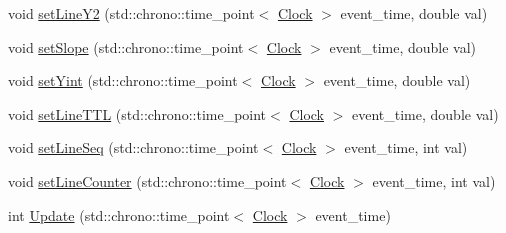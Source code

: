 \begin{DoxyCompactItemize}
\item 
void \mbox{\hyperlink{classLine_a671f64c437fe1bef798476d93c675099}{set\+Line\+Y2}} (std\+::chrono\+::time\+\_\+point$<$ \mbox{\hyperlink{universe_8h_a0ef8d951d1ca5ab3cfaf7ab4c7a6fd80}{Clock}} $>$ event\+\_\+time, double val)
\item 
void \mbox{\hyperlink{classLine_a3fb9e9eab13d146feff0bc891709eaf9}{set\+Slope}} (std\+::chrono\+::time\+\_\+point$<$ \mbox{\hyperlink{universe_8h_a0ef8d951d1ca5ab3cfaf7ab4c7a6fd80}{Clock}} $>$ event\+\_\+time, double val)
\item 
void \mbox{\hyperlink{classLine_ad966eb3f1bd4cb29976b3e97811c344f}{set\+Yint}} (std\+::chrono\+::time\+\_\+point$<$ \mbox{\hyperlink{universe_8h_a0ef8d951d1ca5ab3cfaf7ab4c7a6fd80}{Clock}} $>$ event\+\_\+time, double val)
\item 
void \mbox{\hyperlink{classLine_a602398c8c3131ec7236ccadbab8281d5}{set\+Line\+T\+TL}} (std\+::chrono\+::time\+\_\+point$<$ \mbox{\hyperlink{universe_8h_a0ef8d951d1ca5ab3cfaf7ab4c7a6fd80}{Clock}} $>$ event\+\_\+time, double val)
\item 
void \mbox{\hyperlink{classLine_a7c315c5ffdd4fa875918583738e2e157}{set\+Line\+Seq}} (std\+::chrono\+::time\+\_\+point$<$ \mbox{\hyperlink{universe_8h_a0ef8d951d1ca5ab3cfaf7ab4c7a6fd80}{Clock}} $>$ event\+\_\+time, int val)
\item 
void \mbox{\hyperlink{classLine_ab98abcf3c8546e266ae5bbea243d8b8d}{set\+Line\+Counter}} (std\+::chrono\+::time\+\_\+point$<$ \mbox{\hyperlink{universe_8h_a0ef8d951d1ca5ab3cfaf7ab4c7a6fd80}{Clock}} $>$ event\+\_\+time, int val)
\item 
int \mbox{\hyperlink{classLine_a8c6dece66f5cd93ce40134002a40f505}{Update}} (std\+::chrono\+::time\+\_\+point$<$ \mbox{\hyperlink{universe_8h_a0ef8d951d1ca5ab3cfaf7ab4c7a6fd80}{Clock}} $>$ event\+\_\+time)
\end{DoxyCompactItemize}
